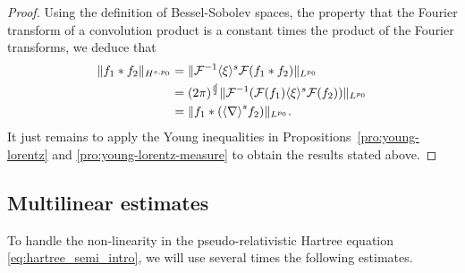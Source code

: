 \documentclass[12pt]{article}
\newcommand{\jnabla}{{\langle\nabla\rangle}}
\theoremstyle{plain}
\newcommand{\meas}{\mathcal{M}}
\begin{document}
\begin{proof}Using the definition of Bessel-Sobolev spaces, the property that the Fourier transform of a convolution product is a constant times the product of the Fourier transforms, we deduce that
   \begin{align*}
       \|f_1*f_2\|_{H^{s,p_0}}
       &= \|\mathcal{F}^{-1}\langle\xi\rangle^s\mathcal{F}(f_1*f_2)\|_{L^{p_0}}\\ \allowdisplaybreaks
       &=(2\pi)^{\frac{d}{2}} \|\mathcal{F}^{-1}(\mathcal{F}(f_1)\langle\xi\rangle^s\mathcal{F}(f_2))\|_{L^{p_0}} \\ \allowdisplaybreaks
       &= \|f_1*(\jnabla^sf_2)\|_{L^{p_0}}.%
   \end{align*}
It just remains to apply the Young inequalities in Propositions~\ref{pro:young-lorentz} and \ref{pro:young-lorentz-measure} to obtain the results stated above.
\end{proof}


\subsection{Multilinear estimates}
 


To handle the non-linearity in the pseudo-relativistic Hartree equation \eqref{eq:hartree_semi_intro}, we will use several times the following estimates.
\end{document}
